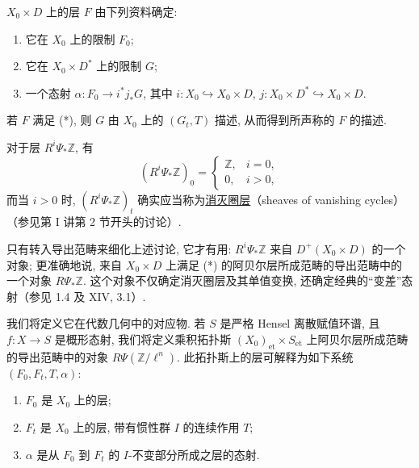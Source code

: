 $X_0\times D$ 上的层 $F$ 由下列资料确定:
\begin{enumerate}[label=\arabic*),leftmargin=2.5em]
\item 它在 $X_0$ 上的限制 $F_0$;
\item 它在 $X_0\times D^*$ 上的限制 $G$;
\item 一个态射 $\alpha:F_0\longrightarrow i^*j_*G$, 其中 $i:X_0\hookrightarrow X_0\times D$, $j:X_0\times D^*\hookrightarrow X_0\times D$.
\end{enumerate}
若 $F$ 满足 (*), 则 $G$ 由 $X_0$ 上的 $(G_t,T)$ 描述, 从而得到所声称的 $F$ 的描述.

对于层 $R^i\Psi_*\mathbb Z$, 有
\begin{equation*}
(R^i\Psi_*\mathbb Z)_0=
\begin{cases}
\mathbb Z, & i=0,\\
0, & i>0,
\end{cases}
\end{equation*}
而当 $i>0$ 时, $(R^i\Psi_*\mathbb Z)_t$ 确实应当称为\underline{消灭圈层}（sheaves of vanishing cycles）（参见第 I 讲第 2 节开头的讨论）.


只有转入导出范畴来细化上述讨论, 它才有用: $R^i\Psi_*\mathbb Z$ 来自 $D^+(X_0\times D)$ 的一个对象; 更准确地说, 来自 $X_0\times D$ 上满足 (*) 的阿贝尔层所成范畴的导出范畴中的一个对象 $R\Psi_*\mathbb Z$. 这个对象不仅确定消灭圈层及其单值变换, 还确定经典的“变差”态射（参见 1.4 及 XIV, 3.1）.

我们将定义它在代数几何中的对应物. 若 $S$ 是严格 Hensel 离散赋值环谱, 且 $f:X\longrightarrow S$ 是概形态射, 我们将定义乘积拓扑斯 $(X_0)_{\mathrm{et}}\times S_{\mathrm{et}}$ 上阿贝尔层所成范畴的导出范畴中的对象 $R\Psi(\mathbb Z/\ell^n)$. 此拓扑斯上的层可解释为如下系统 $(F_0,F_t,T,\alpha)$:
\begin{enumerate}[label=\alph*),leftmargin=2.5em]
\item[$\alpha$)] $F_0$ 是 $X_0$ 上的层;
\item[$\beta$)] $F_t$ 是 $X_0$ 上的层, 带有惯性群 $I$ 的连续作用 $T$;
\item[$\gamma$)] $\alpha$ 是从 $F_0$ 到 $F_t$ 的 $I$-不变部分所成之层的态射.
\end{enumerate}

